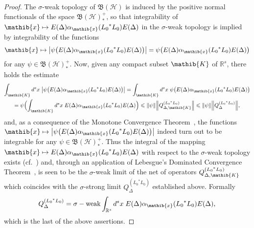 \documentclass[11pt,twoside,openright]{report}
\theoremstyle{definition}
\theoremstyle{plain}
\theoremstyle{remark}
\theoremstyle{assumption}
\DeclareMathOperator{\sw}{\sigma-weak}
\newcommand{\babs}[1]{\bigl\lvert #1 \bigr\rvert}
\newcommand{\norm}[1]{\lVert #1 \rVert}
\newcommand{\Bnorm}[1]{\Bigl\lVert #1 \Bigr\rVert}
\newcommand{\Kib}{\mathib{K}}
\newcommand{\xib}{\mathib{x}}
\newcommand{\Rs}{\mathbb{R}^s}
\newcommand{\BH}{\mathfrak{B} ( \mathscr{H} )}
\newcommand{\ED}{E ( \Delta )}
\newcommand{\aibx}{\alpha_\mathib{x}}
\begin{document}
\begin{proof}
  The $\sigma$-weak topology of $\BH$ is induced by the positive
  normal functionals of the space $\BH^+_*$, so that integrability of
  $\xib \mapsto \ED \aibx ( {L_0}^* L_0 ) \ED$ in the $\sigma$-weak
  topology is implied by integrability of the functions
  \begin{equation*}
    \xib \mapsto \babs{\psi \bigl( \ED \aibx ( {L_0}^* L_0 ) \ED
    \bigr)} = \psi \bigl( \ED \aibx ( {L_0}^* L_0 ) \ED \bigr)
  \end{equation*}
  for any $\psi \in \BH^+_*$. Now, given any compact subset $\Kib$ of
  $\Rs$, there holds the estimate  
  \begin{multline*}
    \int_\Kib d^s x \; \babs{\psi \bigl( \ED \aibx ( {L_0}^* L_0 ) \ED
    \bigr)} = \int_\Kib d^s x \; \psi \bigl( \ED \aibx ( {L_0}^* L_0 )
    \ED \bigr) \\
    = \psi \Bigl( \int_\Kib d^s x \; \ED \aibx ( {L_0}^* L_0 ) \ED
    \Bigr) \leqslant \norm{\psi} \Bnorm{Q_{\Delta , \Kib}^{( {L_0}^* L_0
    )}} \leqslant \norm{\psi} \Bnorm{Q_\Delta^{( {L_0}^* L_0 )}}
    \text{,}
  \end{multline*}
  and, as a consequence of the Monotone Convergence
  Theorem~\cite[II.2.7]{fell/doran:1988a}, the functions $\xib \mapsto
  \babs{\psi \bigl( \ED \aibx ( {L_0}^* L_0 ) \ED \bigr)}$ indeed turn
  out to be integrable for any $\psi \in \BH^+_*$. Thus the integral
  of the mapping $\xib \mapsto \ED \aibx ( {L_0}^* L_0 ) \ED$ with
  respect to the $\sigma$-weak topology exists
  (cf.~\cite[II.6.2]{fell/doran:1988a}) and, through an application of
  Lebesgue's Dominated Convergence
  Theorem~\cite[II.5.6]{fell/doran:1988a}, is seen to be the
  $\sigma$-weak limit of the net of operators $Q_{\Delta , \Kib}^{(
  {L_0}^* L_0 )}$ which coincides with the $\sigma$-strong limit
  $Q_\Delta^{( {L_0}^* L_0 )}$ established above. Formally
  \begin{equation*}
    Q_\Delta^{( {L_0}^* L_0 )} = \sw \int_{\Rs} d^s x \; \ED \aibx (
    {L_0}^* L_0 ) \ED \text{,}
  \end{equation*}
  which is the last of the above assertions.
\end{proof}
\end{document}
